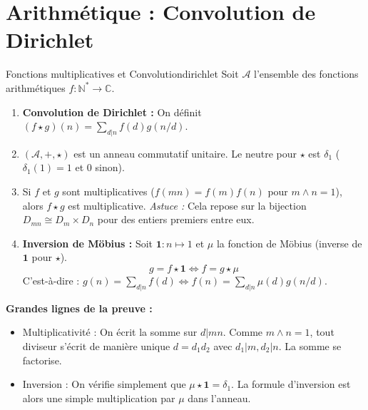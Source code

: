 \documentclass{prepacours}
\begin{document}
\section{Arithmétique : Convolution de Dirichlet}

\begin{proposition}{Fonctions multiplicatives et Convolution}{dirichlet}
    Soit $\mathcal{A}$ l'ensemble des fonctions arithmétiques $f : \mathbb{N}^* \to \mathbb{C}$.
    \begin{enumerate}
        \item \textbf{Convolution de Dirichlet :} On définit $(f \star g)(n) = \sum_{d|n} f(d)g(n/d)$.
        \item $(\mathcal{A}, +, \star)$ est un anneau commutatif unitaire. Le neutre pour $\star$ est $\delta_1$ ($\delta_1(1)=1$ et $0$ sinon).
        \item Si $f$ et $g$ sont multiplicatives ($f(mn)=f(m)f(n)$ pour $m \wedge n = 1$), alors $f \star g$ est multiplicative.
            \textit{Astuce :} Cela repose sur la bijection $D_{mn} \cong D_m \times D_n$ pour des entiers premiers entre eux.
        \item \textbf{Inversion de Möbius :} Soit $\mathbf{1} : n \mapsto 1$ et $\mu$ la fonction de Möbius (inverse de $\mathbf{1}$ pour $\star$).
        \[ g = f \star \mathbf{1} \iff f = g \star \mu \]
        C'est-à-dire : $g(n) = \sum_{d|n} f(d) \iff f(n) = \sum_{d|n} \mu(d) g(n/d)$.
    \end{enumerate}
\end{proposition}

\noindent \textbf{Grandes lignes de la preuve :}
\begin{itemize}
    \item Multiplicativité : On écrit la somme sur $d|mn$. Comme $m \wedge n = 1$, tout diviseur s'écrit de manière unique $d = d_1 d_2$ avec $d_1|m, d_2|n$. La somme se factorise.
    \item Inversion : On vérifie simplement que $\mu \star \mathbf{1} = \delta_1$. La formule d'inversion est alors une simple multiplication par $\mu$ dans l'anneau.
\end{itemize}
\end{document}
